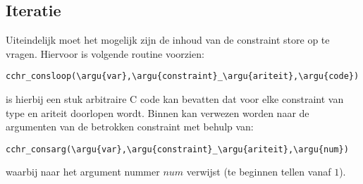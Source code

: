 \subsection{Iteratie}

Uiteindelijk moet het mogelijk zijn de inhoud van de constraint store op te vragen. Hiervoor is volgende routine voorzien: \begin{Verbatim}[commandchars=\\\{\}]
  cchr_consloop(\argu{var},\argu{constraint}_\argu{ariteit},\argu{code})
\end{Verbatim}
 is hierbij een stuk arbitraire C code kan bevatten dat voor elke constraint van type  en ariteit  doorlopen wordt. Binnen  kan verwezen worden naar de argumenten van de betrokken constraint met behulp van: \begin{Verbatim}[commandchars=\\\{\}]
  cchr_consarg(\argu{var},\argu{constraint}_\argu{ariteit},\argu{num})
\end{Verbatim}
waarbij  naar het argument nummer $num$ verwijst (te beginnen tellen vanaf $1$).

